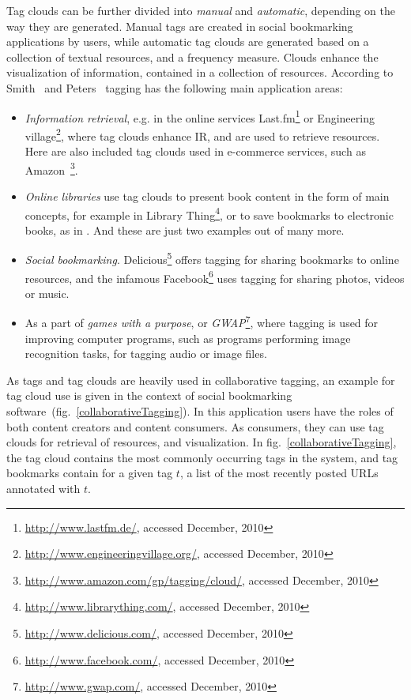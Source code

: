 Tag clouds can be further divided into \textit{manual} and \textit{automatic}, depending on the way they are generated. Manual tags are created in social bookmarking applications by users, while automatic tag clouds are generated based on a collection of textual resources, and a frequency measure. Clouds enhance the visualization of information, contained in a collection of resources. According to Smith~\cite{tagging2008} and Peters~\cite{folksonomiesWeb2.0_2009} tagging has the following main application areas: \\
\begin{itemize}
\item \textit{Information retrieval}, e.g. in the online services Last.fm\footnote{\url{http://www.lastfm.de/}, accessed December, 2010} or Engineering village\footnote{\url{http://www.engineeringvillage.org/}, accessed December, 2010}, where tag clouds enhance \gls{IR}, and are used to retrieve resources. Here are also included tag clouds used in e-commerce services, such as Amazon~\footnote{\url{http://www.amazon.com/gp/tagging/cloud/}, accessed December, 2010}.

\item \textit{Online libraries} use tag clouds to present book content in the form of main concepts, for example in Library Thing\footnote{\url{http://www.librarything.com/}, accessed December, 2010}, or to save bookmarks to electronic books, as in  . And these are just two examples out of many more. \\

\item \textit{Social bookmarking}. Delicious\footnote{\url{http://www.delicious.com/}, accessed December, 2010} offers tagging for sharing bookmarks to online resources, and the infamous Facebook\footnote{\url{http://www.facebook.com/}, accessed December, 2010}  uses tagging for sharing photos, videos or music. \\

\item As a part of \textit{games with a purpose}, or \textit{GWAP}\footnote{\url{http://www.gwap.com/}, accessed December, 2010}, where tagging is used for improving computer programs, such as programs performing image recognition tasks, for tagging audio or image files. \\ 
\end{itemize}

As tags and tag clouds are heavily used in collaborative tagging, an example for tag cloud use is given in the context of social bookmarking software~(fig.~\ref{collaborativeTagging}). In this application users have the roles of both content creators and content consumers. As consumers, they can use tag clouds for retrieval of resources, and visualization. In fig.~\ref{collaborativeTagging}, the tag cloud contains the most commonly occurring tags in the system, and tag bookmarks contain for a given tag $t$, a list of the most recently posted URLs annotated with $t$.  \\  

